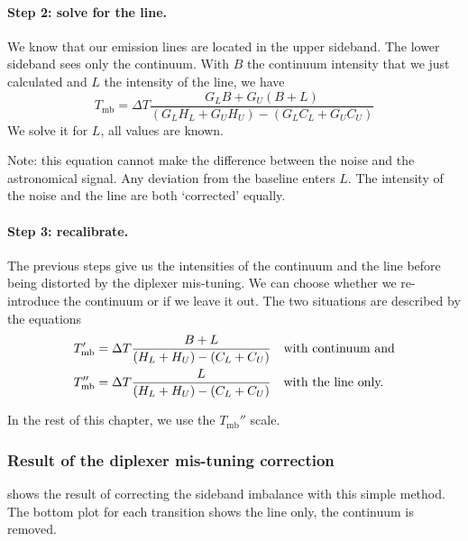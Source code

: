 \paragraph{Step 2: solve for the line.}
We know that our emission lines are located in the upper sideband.
The lower sideband sees only the continuum.
With $B$ the continuum intensity that we just calculated and $L$ the intensity of the line, we have
\begin{equation}
    T_\text{mb}
    =
    \Delta T
    \frac{
        G_L B + G_U (B + L)
    }{
        (G_L H_L + G_U H_U) - (G_L C_L + G_U C_U)
    }
\end{equation}
We solve it for $L$, all values are known.

Note: this equation cannot make the difference between the noise and the astronomical signal.
Any deviation from the baseline enters $L$.
The intensity of the noise and the line are both `corrected' equally.

\paragraph{Step 3: recalibrate.}
The previous steps give us the intensities of the continuum and the line before being distorted by the diplexer mis-tuning.
We can choose whether we re-introduce the continuum or if we leave it out.
The two situations are described by the equations
\begin{align}
    T_\text{mb}'
    &=
    \Delta T
    \frac{B+L}{(H_L + H_U) - (C_L + C_U)} \text{\quad with continuum and}
    \\
    T_\text{mb}''
    &=
    \Delta T
    \frac{L}{(H_L + H_U) - (C_L + C_U)} \text{\quad with the line only.}
\end{align}

In the rest of this chapter, we use the $T_\text{mb}''$ scale.

\subsubsection{Result of the diplexer mis-tuning correction}
 shows the result of correcting the sideband imbalance with this simple method.
The bottom plot for each transition shows the line only, the continuum is removed.

